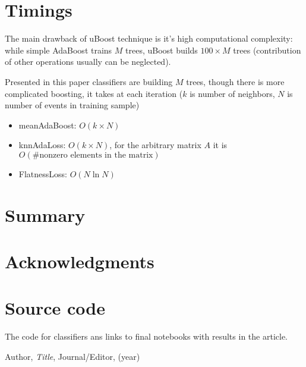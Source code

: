 \documentclass[12pt]{article}
\theoremstyle{definition}
\theoremstyle{remark}
\begin{document}
\section{Timings}

The main drawback of uBoost technique is it's high computational complexity: 
while simple AdaBoost trains $M$ trees, uBoost builds $100 \times M$ trees (contribution of other operations usually can be neglected). 

Presented in this paper classifiers are building $M$ trees, though there is more complicated boosting, it takes at each iteration ($k$ is number of neighbors, $N$ is number of events in training sample)

\begin{itemize}
	\item meanAdaBoost: $O(k \times N)$
	\item knnAdaLoss: $O(k \times N)$, for the arbitrary matrix $A$ it is 
	$O( \text{\#nonzero elements in the matrix})$
	\item FlatnessLoss: $O(N \ln N)$
\end{itemize}


\section{Summary}

\section{Acknowledgments}

\section{Source code}

The code for classifiers ans links to final notebooks with results in the article.



\begin{thebibliography}{99}

 Author, \emph{Title}, Journal/Editor, (year)

\end{thebibliography}
\end{document}
